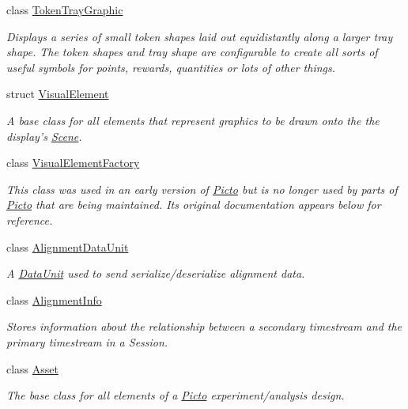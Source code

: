 \begin{DoxyCompactItemize}
class \hyperlink{class_picto_1_1_token_tray_graphic}{Token\-Tray\-Graphic}
\begin{DoxyCompactList}\small\item\em Displays a series of small token shapes laid out equidistantly along a larger tray shape. The token shapes and tray shape are configurable to create all sorts of useful symbols for points, rewards, quantities or lots of other things. \end{DoxyCompactList}\item 
struct \hyperlink{struct_picto_1_1_visual_element}{Visual\-Element}
\begin{DoxyCompactList}\small\item\em A base class for all elements that represent graphics to be drawn onto the the display's \hyperlink{class_picto_1_1_scene}{Scene}. \end{DoxyCompactList}\item 
class \hyperlink{class_picto_1_1_visual_element_factory}{Visual\-Element\-Factory}
\begin{DoxyCompactList}\small\item\em This class was used in an early version of \hyperlink{namespace_picto}{Picto} but is no longer used by parts of \hyperlink{namespace_picto}{Picto} that are being maintained. Its original documentation appears below for reference. \end{DoxyCompactList}\item 
class \hyperlink{class_picto_1_1_alignment_data_unit}{Alignment\-Data\-Unit}
\begin{DoxyCompactList}\small\item\em A \hyperlink{class_picto_1_1_data_unit}{Data\-Unit} used to send serialize/deserialize alignment data. \end{DoxyCompactList}\item 
class \hyperlink{class_picto_1_1_alignment_info}{Alignment\-Info}
\begin{DoxyCompactList}\small\item\em Stores information about the relationship between a secondary timestream and the primary timestream in a Session. \end{DoxyCompactList}\item 
class \hyperlink{class_picto_1_1_asset}{Asset}
\begin{DoxyCompactList}\small\item\em The base class for all elements of a \hyperlink{namespace_picto}{Picto} experiment/analysis design. \end{DoxyCompactList}\item 

\end{DoxyCompactItemize}
